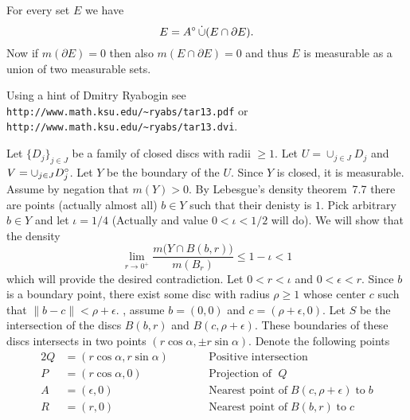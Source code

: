 \begin{enumerate}
\begin{itemize}

For every set $E$ we have
\begin{equation*}
E = \inter{A} \disjunion (E \cap \partial E).
\end{equation*}
Now if \(m(\partial E) = 0\)
then also \(m(E \cap \partial E) = 0\) and thus $E$ is measurable
as a union of two measurable sets.



{\small Using a hint of Dmitry Ryabogin
see 
\linebreak[1]
\texttt{http://www.math.ksu.edu/\~{}ryabs/tar13.pdf}
\linebreak[1]
or
\texttt{http://www.math.ksu.edu/\~{}ryabs/tar13.dvi}{}.}

Let \(\{D_j\}_{j\in J}\) be a family of closed discs
with radii \(\geq 1\). 
Let \(U = \cup_{j\in J} D_j\) and \(V = \cup_{j\in J} D_j^{\circ}\).
Let $Y$ be the boundary of the $U$. Since $Y$ is closed, it is measurable.
Assume by negation that \(m(Y)>0\). 
By Lebesgue's density theorem~7.7 \cite{RudinRCA87}
there are points (actually almost all)
\(b\in Y\) such that their denisty is $1$.
Pick arbitrary \(b\in Y\) and let \(\iota = 1/4\)
(Actually and value \(0 < \iota < 1/2\) will do).
We will show that the density 
\begin{equation*}
\lim_{r\to 0^+} \frac{m\bigl(Y\cap B(b,r)\bigr)}{m(B_r)} \leq 1 - \iota < 1
\end{equation*}
which will provide the desired contradiction.
Let \(0<r<\iota\) and \(0<\epsilon<r\).
Since $b$ is a boundary point,
there exist some disc with radius \(\rho\geq 1\)
whose center $c$ such that \(\|b-c\| < \rho + \epsilon\).
\Wlogy, assume \(b=(0,0)\) and \(c=(\rho + \epsilon, 0)\).
Let $S$ be the intersection
of the discs \(B(b,r)\) and \(B(c,\rho + \epsilon)\).
These boundaries of these discs intersects in two points
\((r\cos\alpha, \pm r \sin\alpha)\). Denote the following points
\begin{alignat*}{2}
Q &= (r\cos\alpha, r \sin\alpha) & & \qquad\textrm{Positive intersection} \\
P &= (r\cos\alpha, 0)            & & \qquad\textrm{Projection of\ }\; Q \\
A &= (\epsilon, 0)               & & \qquad\textrm{Nearest point of}\; 
                                     B(c,\rho+\epsilon)\;\textrm{to}\; b \\
R &= (r, 0)
                                 & & \qquad\textrm{Nearest point of}\; 
                                     B(b,r)\;\textrm{to}\; c \\

\end{alignat*}
\end{itemize}
\end{enumerate}
